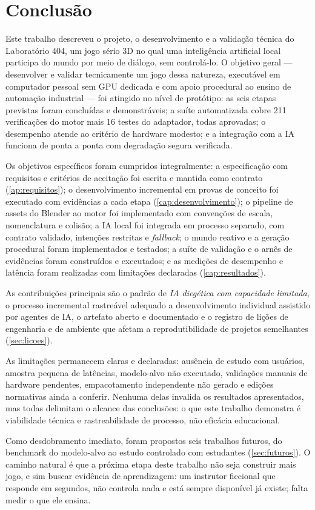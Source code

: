 \chapter{Conclusão}
\label{cap:conclusao}

Este trabalho descreveu o projeto, o desenvolvimento e a validação técnica do
Laboratório 404, um jogo sério 3D no qual uma inteligência artificial local
participa do mundo por meio de diálogo, sem controlá-lo. O objetivo geral ---
desenvolver e validar tecnicamente um jogo dessa natureza, executável em
computador pessoal sem GPU dedicada e com apoio procedural ao ensino de
automação industrial --- foi atingido no nível de protótipo: as seis etapas
previstas foram concluídas e demonstráveis; a suíte automatizada cobre 211
verificações do motor mais 16 testes do adaptador, todas aprovadas; o
desempenho atende ao critério de hardware modesto; e a integração com a IA
funciona de ponta a ponta com degradação segura verificada.

Os objetivos específicos foram cumpridos integralmente: a especificação com
requisitos e critérios de aceitação foi escrita e mantida como contrato
(\autoref{ap:requisitos}); o desenvolvimento incremental em provas de
conceito foi executado com evidências a cada etapa (\autoref{cap:desenvolvimento});
o pipeline de assets do Blender ao motor foi implementado com convenções de
escala, nomenclatura e colisão; a IA local foi integrada em processo separado,
com contrato validado, intenções restritas e \emph{fallback}; o mundo reativo
e a geração procedural foram implementados e testados; a suíte de validação e
o arnês de evidências foram construídos e executados; e as medições de
desempenho e latência foram realizadas com limitações declaradas
(\autoref{cap:resultados}).

As contribuições principais são o padrão de \emph{IA diegética com capacidade
limitada}, o processo incremental rastreável adequado a desenvolvimento
individual assistido por agentes de IA, o artefato aberto e documentado e o
registro de lições de engenharia e de ambiente que afetam a reprodutibilidade
de projetos semelhantes (\autoref{sec:licoes}).

As limitações permanecem claras e declaradas: ausência de estudo com usuários,
amostra pequena de latências, modelo-alvo não executado, validações manuais de
hardware pendentes, empacotamento independente não gerado e edições
normativas ainda a conferir. Nenhuma delas invalida os resultados
apresentados, mas todas delimitam o alcance das conclusões: o que este
trabalho demonstra é viabilidade técnica e rastreabilidade de processo, não
eficácia educacional.

Como desdobramento imediato, foram propostos seis trabalhos futuros, do
benchmark do modelo-alvo ao estudo controlado com estudantes
(\autoref{sec:futuros}). O caminho natural é que a próxima etapa deste
trabalho não seja construir mais jogo, e sim buscar evidência de aprendizagem:
um instrutor ficcional que responde em segundos, não controla nada e está
sempre disponível já existe; falta medir o que ele ensina.
